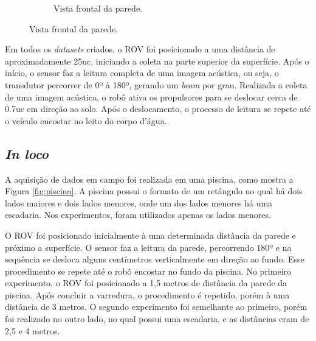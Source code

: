 \begin{figure}[H]
\begin{subfigure}[t]{0.328\textwidth}
        \caption{Vista frontal da parede.}
        \label{fig:dim_frontal}
    \end{subfigure}
\end{figure}

Em todos os \textit{datasets} criados, o ROV foi posicionado a uma distância de aproximadamente 25uc, iniciando a coleta na parte superior da superfície. 
Após o início, o sensor faz a leitura completa de uma imagem acústica, ou seja, o transdutor percorrer de 0º à  180º, gerando um \textit{beam} por grau.
Realizada a coleta de uma imagem acústica, o robô ativa os propulsores para se deslocar cerca de 0.7uc em direção ao solo. 
Após o deslocamento, o processo de leitura se repete até o veículo encostar no leito do corpo d'água.


\subsection{\textit{In loco}}
\label{sec:in_loco}

A aquisição de dados em campo foi realizada em uma piscina, como mostra a Figura \ref{fig:piscina}.
A piscina possui o formato de um retângulo no qual há dois lados maiores e dois lados menores, onde um dos lados menores há uma escadaria.
Nos experimentos, foram utilizados apenas os lados menores. 

O ROV foi posicionado inicialmente à uma determinada distância da parede e próximo a superfície.
O sensor faz a leitura da parede, percorrendo 180º e na sequência se desloca alguns centímetros verticalmente em direção ao fundo.
Esse procedimento se repete até o robô encostar no fundo da piscina.
No primeiro experimento, o ROV foi posicionado a 1,5 metros de distância da parede da piscina.
Após concluir a varredura, o procedimento é repetido, porém à uma distância de 3 metros.
O segundo experimento foi semelhante ao primeiro, porém foi realizado no outro lado, no qual possui uma escadaria, e as distâncias eram de 2,5 e 4 metros.

